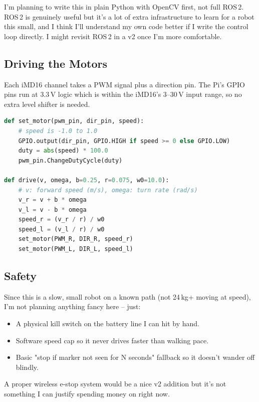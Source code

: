 \documentclass[12pt,a4paper]{article}
\begin{document}
I'm planning to write this in plain Python with OpenCV first, not full ROS\,2. ROS\,2 is
genuinely useful but it's a lot of extra infrastructure to learn for a robot this small,
and I think I'll understand my own code better if I write the control loop directly. I
might revisit ROS\,2 in a v2 once I'm more comfortable.

\subsection{Driving the Motors}

Each iMD16 channel takes a PWM signal plus a direction pin. The Pi's GPIO pins run at
3.3\,V logic which is within the iMD16's 3--30\,V input range, so no extra level shifter
is needed.

\begin{lstlisting}[language=Python, caption={Rough motor control sketch}]
def set_motor(pwm_pin, dir_pin, speed):
    # speed is -1.0 to 1.0
    GPIO.output(dir_pin, GPIO.HIGH if speed >= 0 else GPIO.LOW)
    duty = abs(speed) * 100.0
    pwm_pin.ChangeDutyCycle(duty)

def drive(v, omega, b=0.25, r=0.075, w0=10.0):
    # v: forward speed (m/s), omega: turn rate (rad/s)
    v_r = v + b * omega
    v_l = v - b * omega
    speed_r = (v_r / r) / w0
    speed_l = (v_l / r) / w0
    set_motor(PWM_R, DIR_R, speed_r)
    set_motor(PWM_L, DIR_L, speed_l)
\end{lstlisting}

\subsection{Safety}

Since this is a slow, small robot on a known path (not 24\,kg+ moving at speed), I'm not
planning anything fancy here -- just:
\begin{itemize}
    \item A physical kill switch on the battery line I can hit by hand.
    \item Software speed cap so it never drives faster than walking pace.
    \item Basic "stop if marker not seen for N seconds" fallback so it doesn't wander off
    blindly.
\end{itemize}

A proper wireless e-stop system would be a nice v2 addition but it's not something I can
justify spending money on right now.

\end{document}
